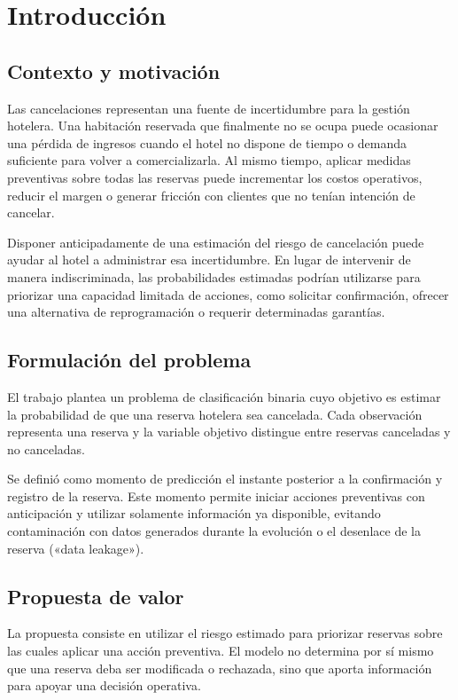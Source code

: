 \section{Introducción}

\subsection{Contexto y motivación}

Las cancelaciones representan una fuente de incertidumbre para la gestión
hotelera. Una habitación reservada que finalmente no se ocupa puede ocasionar
una pérdida de ingresos cuando el hotel no dispone de tiempo o demanda
suficiente para volver a comercializarla. Al mismo tiempo, aplicar medidas
preventivas sobre todas las reservas puede incrementar los costos operativos,
reducir el margen o generar fricción con clientes que no tenían intención de
cancelar.

Disponer anticipadamente de una estimación del riesgo de cancelación puede
ayudar al hotel a administrar esa incertidumbre. En lugar de intervenir de
manera indiscriminada, las probabilidades estimadas podrían utilizarse para
priorizar una capacidad limitada de acciones, como solicitar confirmación,
ofrecer una alternativa de reprogramación o requerir determinadas garantías.

\subsection{Formulación del problema}

El trabajo plantea un problema de clasificación binaria cuyo objetivo es
estimar la probabilidad de que una reserva hotelera sea cancelada. Cada
observación representa una reserva y la variable objetivo distingue entre
reservas canceladas y no canceladas.

Se definió como momento de predicción el instante posterior a la confirmación
y registro de la reserva. Este momento permite iniciar acciones preventivas con
anticipación y utilizar solamente información ya disponible, evitando
contaminación con datos generados durante la evolución o el desenlace de la
reserva («data leakage»).

\subsection{Propuesta de valor}

La propuesta consiste en utilizar el riesgo estimado para priorizar reservas
sobre las cuales aplicar una acción preventiva. El modelo no determina por sí
mismo que una reserva deba ser modificada o rechazada, sino que aporta
información para apoyar una decisión operativa.

